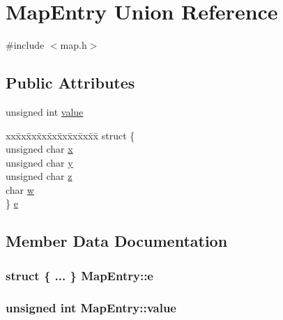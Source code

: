 \hypertarget{unionMapEntry}{}\section{Map\+Entry Union Reference}
\label{unionMapEntry}


{\ttfamily \#include $<$map.\+h$>$}

\subsection*{Public Attributes}
\begin{DoxyCompactItemize}
\item 
unsigned int \hyperlink{unionMapEntry_a5dd4efdec12b49b1f2fe58aad41e8f50}{value}
\item 
\begin{tabbing}
xx\=xx\=xx\=xx\=xx\=xx\=xx\=xx\=xx\=\kill
struct \{\\
\>unsigned char \hyperlink{unionMapEntry_a2ce48990b14ea63b8b166c044a845902}{x}\\
\>unsigned char \hyperlink{unionMapEntry_a3cb395be05afd1381c3f5d862a2218d3}{y}\\
\>unsigned char \hyperlink{unionMapEntry_aeebe1190e2585cd8bbdd32b3faf590cd}{z}\\
\>char \hyperlink{unionMapEntry_a95795e5a3f7c18129e5839d26b8b7167}{w}\\
\} \hyperlink{unionMapEntry_a278b4a881f536989cf29ee53535b7f98}{e}\\

\end{tabbing}\end{DoxyCompactItemize}


\subsection{Member Data Documentation}
\subsubsection[{\texorpdfstring{e}{e}}]{\setlength{\rightskip}{0pt plus 5cm}struct \{ ... \}   Map\+Entry\+::e}\hypertarget{unionMapEntry_a278b4a881f536989cf29ee53535b7f98}{}\label{unionMapEntry_a278b4a881f536989cf29ee53535b7f98}
\subsubsection[{\texorpdfstring{value}{value}}]{\setlength{\rightskip}{0pt plus 5cm}unsigned int Map\+Entry\+::value}\hypertarget{unionMapEntry_a5dd4efdec12b49b1f2fe58aad41e8f50}{}\label{unionMapEntry_a5dd4efdec12b49b1f2fe58aad41e8f50}
